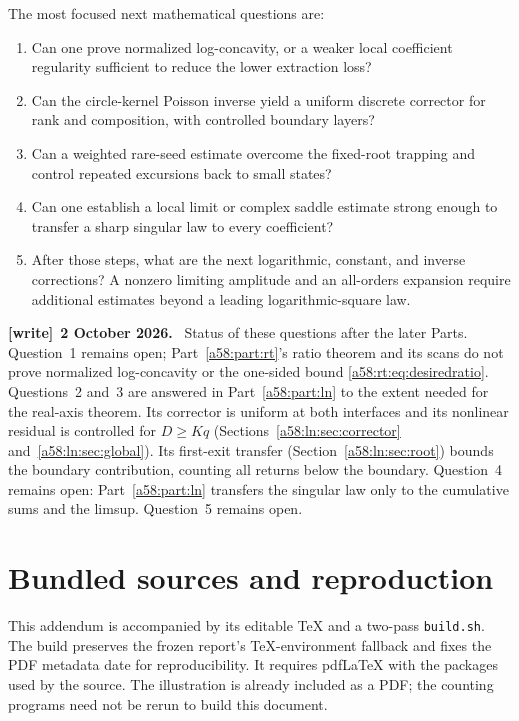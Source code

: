 \documentclass[11pt,letterpaper]{article}
\theoremstyle{remark}
\newenvironment{writenote}[1][]{\par\smallskip\begingroup\small
 \noindent\textbf{[write]}\if\relax\detokenize{#1}\relax\else~\textbf{#1.}\fi\ }%
 {\par\endgroup\smallskip}
\begin{document}
The most focused next mathematical questions are:
\begin{enumerate}
\item Can one prove normalized log-concavity, or a weaker local coefficient regularity sufficient to reduce the lower extraction loss?
\item Can the circle-kernel Poisson inverse yield a uniform discrete corrector for rank and composition, with controlled boundary layers?
\item Can a weighted rare-seed estimate overcome the fixed-root trapping and control repeated excursions back to small states?
\item Can one establish a local limit or complex saddle estimate strong enough to transfer a sharp singular law to every coefficient?
\item After those steps, what are the next logarithmic, constant, and inverse corrections? A nonzero limiting amplitude and an all-orders expansion require additional estimates beyond a leading logarithmic-square law.
\end{enumerate}
\begin{writenote}[2 October 2026]
Status of these questions after the later Parts. Question~1 remains open; Part~\ref{a58:part:rt}'s ratio theorem and its scans do not prove normalized log-concavity or the one-sided bound \eqref{a58:rt:eq:desiredratio}. Questions~2 and~3 are answered in Part~\ref{a58:part:ln} to the extent needed for the real-axis theorem. Its corrector is uniform at both interfaces and its nonlinear residual is controlled for $D\ge Kq$ (Sections~\ref{a58:ln:sec:corrector} and~\ref{a58:ln:sec:global}). Its first-exit transfer (Section~\ref{a58:ln:sec:root}) bounds the boundary contribution, counting all returns below the boundary. Question~4 remains open: Part~\ref{a58:part:ln} transfers the singular law only to the cumulative sums and the limsup. Question~5 remains open.
\end{writenote}

\section{Bundled sources and reproduction}\label{a58:fn:sec:bundle}
This addendum is accompanied by its editable TeX and a two-pass \texttt{build.sh}. The build preserves the frozen report's TeX-environment fallback and fixes the PDF metadata date for reproducibility. It requires pdfLaTeX with the packages used by the source. The illustration is already included as a PDF; the counting programs need not be rerun to build this document.
\end{document}
